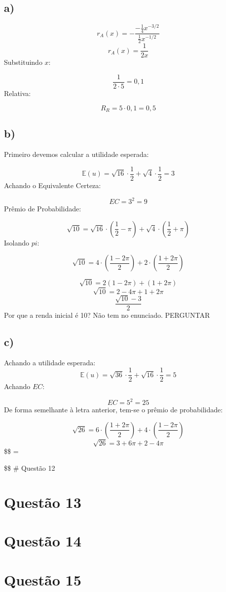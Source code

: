 \documentclass[
  letterpaper,
  DIV=11,
  numbers=noendperiod]{scrartcl}
\begin{document}
\subsection{a)}\label{a-6}

\[
r_A(x)= - \frac{-\frac{1}{4}x^{-3/2}}{\frac{1}{2}x^{-1/2}}
\] \[
r_A(x)= \frac{1}{2x}
\] Substituindo \(x\):

\[
\frac{1}{2 \cdot 5} = 0,1
\] Relativa:

\[
R_R = 5 \cdot 0,1 = 0,5
\]

\subsection{b)}\label{b-6}

Primeiro devemos calcular a utilidade esperada:

\[
\mathbb{E}(u) = \sqrt{16} \cdot \frac{1}{2} + \sqrt{4}\cdot \frac{1}{2} = 3
\] Achando o Equivalente Certeza:

\[
EC = 3^2 = 9
\] Prêmio de Probabilidade:

\[
\sqrt{10} =   \sqrt{16} \cdot \left(\frac{1}{2}- \pi\right) + \sqrt{4}\cdot \left(\frac{1}{2}+ \pi\right)
\] Isolando \(pi\):

\[
\sqrt{10} = 4 \cdot \left(\frac{1-2\pi}{2}\right) + 2\cdot \left(\frac{1+2\pi}{2} \right)
\]

\[
\sqrt{10} = 2(1-2\pi) + (1+2\pi)
\] \[
\sqrt{10} = 2-4\pi +1 +2\pi
\] \[
\frac{\sqrt{10} - 3}{2}
\] Por que a renda inicial é 10? Não tem no enunciado. PERGUNTAR

\subsection{c)}\label{c-2}

Achando a utilidade esperada: \[
\mathbb{E}(u) = \sqrt{36} \cdot \frac{1}{2} + \sqrt{16}\cdot \frac{1}{2} = 5
\] Achando \(EC\):

\[
EC = 5^2 = 25
\] De forma semelhante à letra anterior, tem-se o prêmio de
probabilidade:

\[
\sqrt{26} = 6 \cdot \left(\frac{1+2\pi}{2}\right) + 4\cdot \left(\frac{1-2\pi}{2} \right)
\] \[
\sqrt{26}= 3+6\pi + 2 - 4\pi
\] \$\$ \pi = 

\$\$ \# Questão 12

\section{Questão 13}\label{questuxe3o-13}

\section{Questão 14}\label{questuxe3o-14}

\section{Questão 15}\label{questuxe3o-15}
\end{document}
